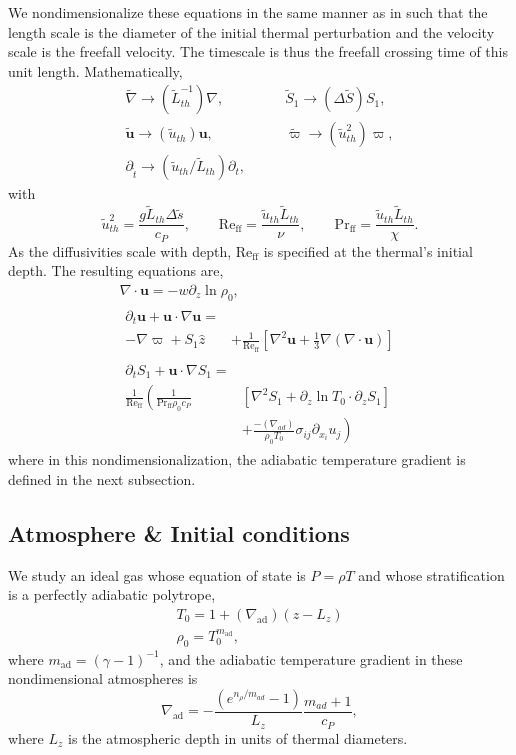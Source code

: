 \documentclass[twocolumn, amsmath, amsfonts, amssymb, trackchanges]{aastex62}
\newcommand{\DivU}{\ensuremath{\nabla\cdot\bm{u}}}
\newcommand{\td}[1]{\ensuremath{\widetilde{#1}}}
\newcommand{\grad}{\ensuremath{\nabla}}
\begin{document}
We nondimensionalize these equations in the same manner as in
\citet{lecoanet&jeevanjee2018} such that
the length scale is the diameter of the initial thermal perturbation
and the velocity scale is the freefall velocity. The timescale is thus
the freefall crossing time of this unit length. Mathematically,
\begin{equation}
\begin{split}
\td{\grad}\rightarrow(\td{L}_{th}^{-1})\grad, \qquad&
\td{S}_1 \rightarrow(\Delta\td{S})S_1,\\
\td{\bm{u}} \rightarrow (\td{u}_{th})\bm{u}, \qquad&
\td{\varpi} \rightarrow (\td{u}_{th}^2)\varpi,\\
\partial_{\tilde{t}} \rightarrow (\td{u}_{th}/\td{L}_{th})\partial_t,\qquad&
\end{split}
\end{equation}
with
\begin{equation}
\tilde{u}_{th}^2 = \frac{g \tilde{L}_{th} \Delta \tilde{s}}{c_P}, \qquad
\text{Re}_{\text{ff}} = \frac{\tilde{u}_{th} \tilde{L}_{th}}{\nu}, \qquad
\text{Pr}_{\text{ff}} = \frac{\tilde{u}_{th} \tilde{L}_{th}}{\chi}.
\end{equation}
As the diffusivities scale with depth, Re$_{\text{ff}}$ is specified at the
thermal's initial depth.
The resulting equations are,
\begin{gather}
\DivU = -w \partial_z \ln\rho_0, \\
\begin{split}
\partial_t \bm{u} + \bm{u}\cdot\grad\bm{u} =& \\
- \grad \varpi + S_1\hat{z} &
+ \frac{1}{\text{Re}_{\text{ff}}}\left[\grad^2 \bm{u} + \frac{1}{3}\grad(\DivU)\right] 
\end{split}\\
\begin{split}
\partial_t S_1 + \bm{u}\cdot\grad S_1 =& \\
\frac{1}{\text{Re}_{\text{ff}}}\left(\frac{1}{\text{Pr}_{\text{ff}}\rho_0c_P }\right.&[\grad^2 S_1 + \partial_z\ln T_0 \cdot\partial_z S_1]\\
&+ \left.\frac{-(\grad_{ad})}{\rho_0 T_0}\sigma_{ij}\partial_{x_i}u_j \right)
\end{split}
\end{gather}
where in this nondimensionalization, the adiabatic temperature gradient is defined
in the next subsection.

\subsection{Atmosphere \& Initial conditions}
We study an ideal gas whose equation of state is $P = \rho T$ and whose stratification
is a perfectly adiabatic polytrope,
\begin{gather}
T_0 = 1 + (\grad_{\text{ad}})(z - L_z) \\
\rho_0 = T_0^{m_{\text{ad}}},
\end{gather}
where $m_{\text{ad}} = (\gamma-1)^{-1}$, and the adiabatic temperature 
gradient in these nondimensional atmospheres is
$$
\grad_{\text{ad}} = -\frac{(e^{n_\rho/m_{ad}} - 1)}{L_z}\frac{m_{ad} + 1}{c_P},
$$
where $L_z$ is the atmospheric depth in units of thermal diameters.
 
\end{document}

